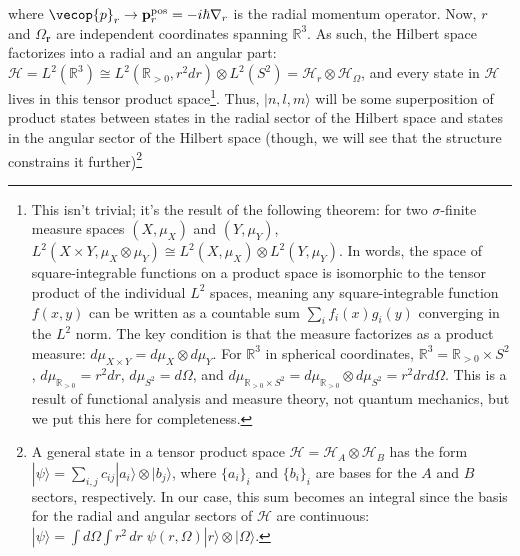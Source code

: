 where $\vecop{p}_r\rightarrow\mathbf{p}_r^\text{pos}=-i\hbar\nabla_r$ is the radial momentum operator. Now, $r$ and $\Omega_{\mathbf{r}}$ are independent coordinates spanning $\mathbb{R}^3$. As such, the Hilbert space factorizes into a radial and an angular part: $\mathcal{H}=L^2(\mathbb{R}^3)\cong L^2(\mathbb{R}_{>0},r^2dr)\otimes L^2(S^2)=\mathcal{H}_r\otimes\mathcal{H}_\Omega$, and every state in $\mathcal{H}$ lives in this tensor product space\footnote{
This isn't trivial; it's the result of the following theorem: for two $\sigma$-finite measure spaces $(X, \mu_X)$ and $(Y, \mu_Y)$, $L^2(X\times Y, \mu_X\otimes \mu_Y)\cong L^2(X,\mu_X)\otimes L^2(Y, \mu_Y)$. In words, the space of square-integrable functions on a product space is isomorphic to the tensor product of the individual $L^2$ spaces, meaning any square-integrable function $f(x,y)$ can be written as a countable sum $\sum_i f_i(x)g_i(y)$ converging in the $L^2$ norm. The key condition is that the measure factorizes as a product measure: $d\mu_{X\times Y}=d\mu_X\otimes d\mu_Y$. For $\mathbb{R}^3$ in spherical coordinates, $\mathbb{R}^3=\mathbb{R}_{>0}\times S^2$, $d\mu_{\mathbb{R}_{>0}}=r^2dr$, $d\mu_{S^2}=d\Omega$, and $d\mu_{\mathbb{R}_{>0}\times S^2}=d\mu_{\mathbb{R}_{>0}}\otimes d\mu_{S^2}=r^2drd\Omega$. This is a result of functional analysis and measure theory, not quantum mechanics, but we put this here for completeness.
}. Thus, $|n,l,m\rangle$ will be some superposition of product states between states in the radial sector of the Hilbert space and states in the angular sector of the Hilbert space (though, we will see that the structure constrains it further)\footnote{A general state in a tensor product space $\mathcal{H}=\mathcal{H}_A\otimes\mathcal{H}_B$ has the form $|\psi\rangle=\sum_{i,j}c_{ij}|a_i\rangle\otimes |b_j\rangle$, where $\{a_i\}_i$ and $\{b_i\}_i$ are bases for the $A$ and $B$ sectors, respectively. In our case, this sum becomes an integral since the basis for the radial and angular sectors of $\mathcal{H}$ are continuous: $|\psi\rangle=\int d\Omega\int r^2\,dr\; \psi(r, \Omega)|r\rangle\otimes|\Omega\rangle$.
}

